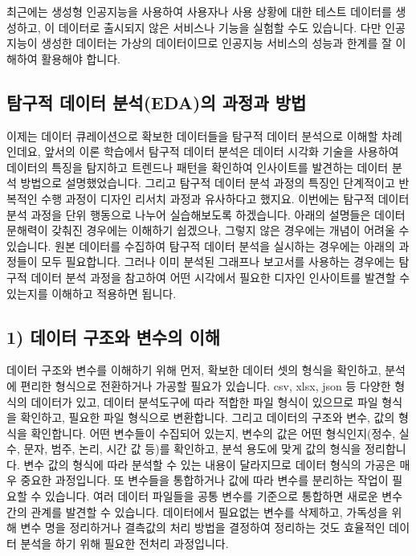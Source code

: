 \documentclass[
  letterpaper,
]{book}
\begin{document}
최근에는 생성형 인공지능을 사용하여 사용자나 사용 상황에 대한 테스트
데이터를 생성하고, 이 데이터로 출시되지 않은 서비스나 기능을 실험할 수도
있습니다. 다만 인공지능이 생성한 데이터는 가상의 데이터이므로 인공지능
서비스의 성능과 한계를 잘 이해하여 활용해야 합니다.

\subsection{탐구적 데이터 분석(EDA)의 과정과
방법}\label{uxd0d0uxad6cuxc801-uxb370uxc774uxd130-uxbd84uxc11dedauxc758-uxacfcuxc815uxacfc-uxbc29uxbc95}

이제는 데이터 큐레이션으로 확보한 데이터들을 탐구적 데이터 분석으로
이해할 차례인데요, 앞서의 이론 학습에서 탐구적 데이터 분석은 데이터
시각화 기술을 사용하여 데이터의 특징을 탐지하고 트렌드나 패턴을 확인하여
인사이트를 발견하는 데이터 분석 방법으로 설명했었습니다. 그리고 탐구적
데이터 분석 과정의 특징인 단계적이고 반복적인 수행 과정이 디자인 리서치
과정과 유사하다고 했지요. 이번에는 탐구적 데이터 분석 과정을 단위
행동으로 나누어 실습해보도록 하겠습니다. 아래의 설명들은 데이터 문해력이
갖춰진 경우에는 이해하기 쉽겠으나, 그렇지 않은 경우에는 개념이 어려울 수
있습니다. 원본 데이터를 수집하여 탐구적 데이터 분석을 실시하는 경우에는
아래의 과정들이 모두 필요합니다. 그러나 이미 분석된 그래프나 보고서를
사용하는 경우에는 탐구적 데이터 분석 과정을 참고하여 어떤 시각에서
필요한 디자인 인사이트를 발견할 수 있는지를 이해하고 적용하면 됩니다.

\subsection{1) 데이터 구조와 변수의
이해}\label{uxb370uxc774uxd130-uxad6cuxc870uxc640-uxbcc0uxc218uxc758-uxc774uxd574}

데이터 구조와 변수를 이해하기 위해 먼저, 확보한 데이터 셋의 형식을
확인하고, 분석에 편리한 형식으로 전환하거나 가공할 필요가 있습니다. csv,
xlsx, json 등 다양한 형식의 데이터가 있고, 데이터 분석도구에 따라 적합한
파일 형식이 있으므로 파일 형식을 확인하고, 필요한 파일 형식으로
변환합니다. 그리고 데이터의 구조와 변수, 값의 형식을 확인합니다. 어떤
변수들이 수집되어 있는지, 변수의 값은 어떤 형식인지(정수, 실수, 문자,
범주, 논리, 시간 값 등)를 확인하고, 분석 용도에 맞게 값의 형식을
정리합니다. 변수 값의 형식에 따라 분석할 수 있는 내용이 달라지므로
데이터 형식의 가공은 매우 중요한 과정입니다. 또 변수들을 통합하거나 값에
따라 변수를 분리하는 작업이 필요할 수 있습니다. 여러 데이터 파일들을
공통 변수를 기준으로 통합하면 새로운 변수 간의 관계를 발견할 수
있습니다. 데이터에서 필요없는 변수를 삭제하고, 가독성을 위해 변수 명을
정리하거나 결측값의 처리 방법을 결정하여 정리하는 것도 효율적인 데이터
분석을 하기 위해 필요한 전처리 과정입니다.
\end{document}
